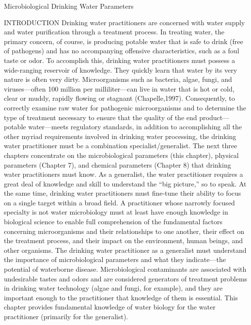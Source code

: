 \documentclass{article}
\begin{document}
Microbiological Drinking Water Parameters

INTRODUCTION Drinking water practitioners are concerned with water
supply and water purification through a treatment process. In treating
water, the primary concern, of course, is producing potable water that
is safe to drink (free of pathogens) and has no accompanying offensive
characteristics, such as a foul taste or odor. To accomplish this,
drinking water practitioners must possess a wide-ranging reservoir of
knowledge. They quickly learn that water by its very nature is often
very dirty. Microorganisms such as bacteria, algae, fungi, and
viruses---often 100 million per milliliter---can live in water that is
hot or cold, clear or muddy, rapidly flowing or stagnant
(Chapelle,1997). Consequently, to correctly examine raw water for
pathogenic microorganisms and to determine the type of treatment
necessary to ensure that the quality of the end product---potable
water---meets regulatory standards, in addition to accomplishing all the
other myriad requirements involved in drinking water processing, the
drinking water practitioner must be a combination specialist/generalist.
The next three chapters concentrate on the microbiological parameters
(this chapter), physical parameters (Chapter 7), and chemical parameters
(Chapter 8) that drinking water practitioners must know. As a
generalist, the water practitioner requires a great deal of knowledge
and skill to understand the ``big picture,'' so to speak. At the same
time, drinking water practitioners must fine-tune their ability to focus
on a single target within a broad field. A practitioner whose narrowly
focused specialty is not water microbiology must at least have enough
knowledge in biological science to enable full comprehension of the
fundamental factors concerning microorganisms and their relationships to
one another, their effect on the treatment process, and their impact on
the environment, human beings, and other organisms. The drinking water
practitioner as a generalist must understand the importance of
microbiological parameters and what they indicate---the potential of
waterborne disease. Microbiological contaminants are associated with
undesirable tastes and odors and are considered generators of treatment
problems in drinking water technology (algae and fungi, for example),
and they are important enough to the practitioner that knowledge of them
is essential. This chapter provides fundamental knowledge of water
biology for the water practitioner (primarily for the generalist).
\end{document}
